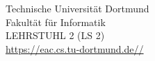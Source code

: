 \begin{titlepage}
    \vspace*{2.5cm}
    \hspace*{\links}
    \begin{minipage}[b]{8cm}

        \raggedright
        Technische Universität Dortmund \\
        Fakultät für Informatik\\
        LEHRSTUHL 2 (LS 2)\\
        \url{https://eac.cs.tu-dortmund.de//}

    \end{minipage}

\end{titlepage}
